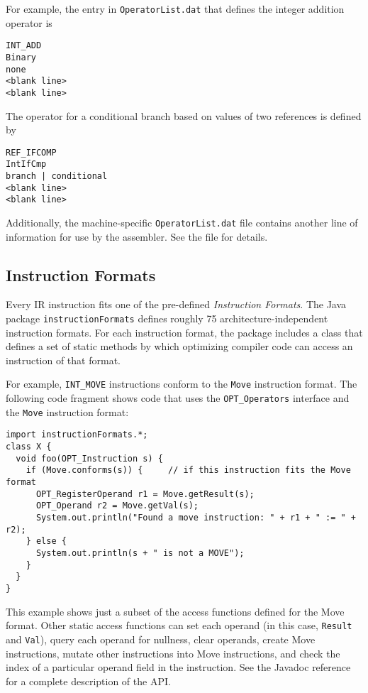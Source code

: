 For example, the entry in {\tt OperatorList.dat} that defines the integer
addition operator is
\begin{verbatim}
INT_ADD
Binary
none
<blank line>
<blank line>
\end{verbatim}

The operator for a conditional branch based on values of two references is
defined by
\begin{verbatim}
REF_IFCOMP
IntIfCmp
branch | conditional
<blank line>
<blank line>
\end{verbatim}

Additionally,  the machine-specific {\tt OperatorList.dat} file contains 
another line of information for use by the assembler.  See the file
for details. 

\PowerPCTMFooter

\subsection{Instruction Formats}\label{iformats}

Every IR instruction fits one of the pre-defined {\em Instruction Formats}.
The Java package {\tt instructionFormats} defines roughly 75 architecture-independent
instruction formats.  For each instruction format, the package includes a class
that defines a set of static methods by which optimizing compiler
code can access an instruction of that format.

For example, {\tt INT\_MOVE} instructions conform to the {\tt Move}
instruction format.  The following code fragment shows code that uses the
{\tt OPT\_Operators} interface and the {\tt Move} instruction format:
\begin{verbatim}
import instructionFormats.*;
class X {
  void foo(OPT_Instruction s) {
    if (Move.conforms(s)) {     // if this instruction fits the Move format
      OPT_RegisterOperand r1 = Move.getResult(s);
      OPT_Operand r2 = Move.getVal(s);
      System.out.println("Found a move instruction: " + r1 + " := " + r2);
    } else {
      System.out.println(s + " is not a MOVE");
    }
  }
}
\end{verbatim}

This example shows just a subset of the access functions defined for the
Move format.  Other static access functions can set each operand 
(in this case, {\tt Result} and {\tt Val}), query each operand for
nullness, clear operands, create Move instructions, mutate other
instructions into Move instructions, and check the index of a particular
operand field in the instruction.  See the Javadoc reference for a complete
description of the API.

